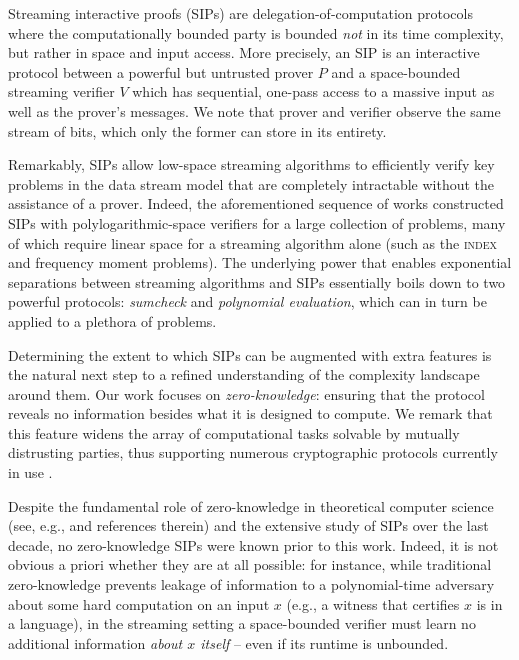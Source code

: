 \documentclass[10pt,a4paper]{article}
\theoremstyle{definition}
\newcommand{\indexproblem}{\normalfont\textsc{index}\xspace}
\begin{document}
Streaming interactive proofs (SIPs) are delegation-of-computation protocols where the computationally bounded party is bounded \emph{not} in its time complexity, but rather in space and input access. More precisely, an SIP is an interactive protocol between a powerful but untrusted prover $P$ and a space-bounded streaming verifier $V$ which has sequential, one-pass access to a massive input as well as the prover's messages. We note that prover and verifier observe the same stream of bits, which only the former can store in its entirety.

Remarkably, SIPs allow low-space streaming algorithms to efficiently verify key problems in the data stream model that are completely intractable without the assistance of a prover. Indeed, the aforementioned sequence of works constructed SIPs with polylogarithmic-space verifiers for a large collection of problems, many of which require linear space for a streaming algorithm alone (such as the \indexproblem and frequency moment problems). The underlying power that enables exponential separations between streaming algorithms and SIPs essentially boils down to two powerful protocols: \emph{sumcheck} and \emph{polynomial evaluation}, which can in turn be applied to a plethora of problems.

Determining the extent to which SIPs can be augmented with extra features is the natural next step to a refined understanding of the complexity landscape around them. Our work focuses on \emph{zero-knowledge}: ensuring that the protocol reveals no information besides what it is designed to compute. We remark that this feature widens the array of computational tasks solvable by mutually distrusting parties, thus supporting numerous cryptographic protocols currently in use \cite{BCGGMTV14,BBHR18,BCRSVW19}.

Despite the fundamental role of zero-knowledge in theoretical computer science (see, e.g., \cite{V99, G02, V07, G08} and references therein) and the extensive study of SIPs over the last decade, no zero-knowledge SIPs were known prior to this work. Indeed, it is not obvious a priori whether they are at all possible: for instance, while traditional zero-knowledge prevents leakage of information to a polynomial-time adversary about some hard computation on an input $x$ (e.g., a witness that certifies $x$ is in a language), in the streaming setting a space-bounded verifier must learn no additional information \emph{about $x$ itself} -- even if its runtime is unbounded.            
\end{document}
